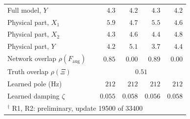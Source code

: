 \begin{tabular}{l r r r r r}
Full model, $Y$ &  & $4.3$ & $4.2$ & $4.3$ & $4.2$\\
Physical part, $X_1$ &  & $5.9$ & $4.7$ & $5.5$ & $4.6$\\
Physical part, $X_2$ &  & $4.3$ & $4.6$ & $4.4$ & $4.8$\\
Physical part, $Y$ &  & $4.2$ & $5.1$ & $3.7$ & $4.4$\\
\midrule
Network overlap $\rho(F_{\mathrm{aug}})$ &  & $0.85$ & $0.00$ & $0.89$ & $0.00$\\
Truth overlap $\rho(\Xi)$ & & \multicolumn{4}{c}{$0.51$}\\
Learned pole (Hz) &  & $212$ & $212$ & $212$ & $212$\\
Learned damping $\zeta$ &  & $0.055$ & $0.058$ & $0.056$ & $0.058$\\
\bottomrule
\multicolumn{6}{l}{\footnotesize $^\dagger$ R1, R2: preliminary, update 19500 of 33400}\\
\end{tabular}
